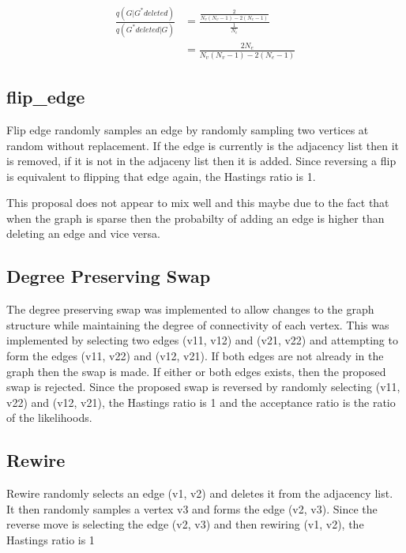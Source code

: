 \documentclass[]{article}
\numberwithin{equation}{section}
\begin{document}
\[ \begin{aligned} \frac{q(G|G^* deleted)}{q(G^* deleted|G)} & = \frac{\frac{2}{N_v(N_v-1) - 2(N_e-1)}}{\frac{1}{N_e}} \\ &= \frac{2N_e}{N_v(N_v-1) - 2(N_e-1)} \end{aligned} \]

\hypertarget{flip_edge}{%
\subsection{flip\_edge}\label{flip_edge}}

Flip edge randomly samples an edge by randomly sampling two vertices at
random without replacement. If the edge is currently is the adjacency
list then it is removed, if it is not in the adjaceny list then it is
added. Since reversing a flip is equivalent to flipping that edge again,
the Hastings ratio is 1.

This proposal does not appear to mix well and this maybe due to the fact
that when the graph is sparse then the probabilty of adding an edge is
higher than deleting an edge and vice versa.

\hypertarget{degree-preserving-swap}{%
\subsection{Degree Preserving Swap}\label{degree-preserving-swap}}

The degree preserving swap was implemented to allow changes to the graph
structure while maintaining the degree of connectivity of each vertex.
This was implemented by selecting two edges (v11, v12) and (v21, v22)
and attempting to form the edges (v11, v22) and (v12, v21). If both
edges are not already in the graph then the swap is made. If either or
both edges exists, then the proposed swap is rejected. Since the
proposed swap is reversed by randomly selecting (v11, v22) and (v12,
v21), the Hastings ratio is 1 and the acceptance ratio is the ratio of
the likelihoods.

\hypertarget{rewire}{%
\subsection{Rewire}\label{rewire}}

Rewire randomly selects an edge (v1, v2) and deletes it from the
adjacency list. It then randomly samples a vertex v3 and forms the edge
(v2, v3). Since the reverse move is selecting the edge (v2, v3) and then
rewiring (v1, v2), the Hastings ratio is 1
\end{document}
